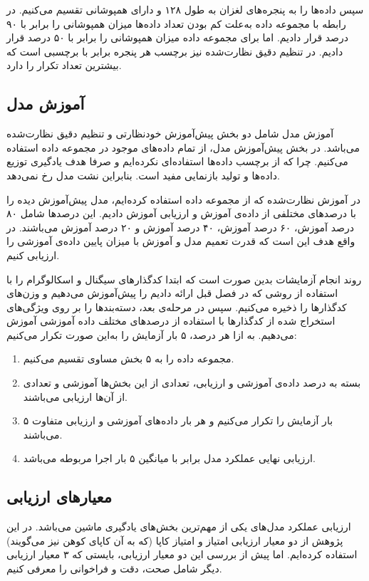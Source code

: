 سپس داده‌ها را به پنجره‌های لغزان به طول ۱۲۸ و دارای همپوشانی تقسیم می‌کنیم. در رابطه با مجموعه داده  به‌علت کم بودن تعداد داده‌ها میزان همپوشانی را برابر با ۹۰ درصد قرار دادیم. اما برای مجموعه داده  میزان همپوشانی را برابر با ۵۰ درصد قرار دادیم. در تنظیم دقیق نظارت‌شده نیز برچسب هر پنجره برابر با برچسبی است که بیشترین تعداد تکرار را دارد.

\subsection{آموزش مدل}

آموزش مدل شامل دو بخش پیش‌آموزش خودنظارتی و تنظیم دقیق نظارت‌شده می‌باشد. در بخش پیش‌آموزش مدل، از تمام داده‌های موجود در مجموعه داده استفاده می‌کنیم. چرا که از برچسب داده‌ها استفاده‌ای نکرده‌ایم و صرفا هدف یادگیری توزیع داده‌ها و تولید بازنمایی مفید است. بنابراین
نشت مدل
رخ نمی‌دهد.

در آموزش نظارت‌شده که از مجموعه داده  استفاده کرده‌ایم، مدل پیش‌آموزش دیده را با درصدهای مختلفی از داده‌ی آموزش و ارزیابی آموزش دادیم. این درصدها شامل ۸۰ درصد آموزش، ۶۰ درصد آموزش، ۴۰ درصد آموزش و ۲۰ درصد آموزش می‌باشند. در واقع هدف این است که قدرت تعمیم مدل و آموزش با میزان پایین داده‌ی آموزشی را ارزیابی کنیم.

روند انجام آزمایشات بدین صورت است که ابتدا کدگذارهای سیگنال و اسکالوگرام را با استفاده از روشی که در فصل قبل ارائه دادیم را پیش‌آموزش می‌دهیم و وزن‌های 
کدگذارها را ذخیره می‌کنیم. سپس در مرحله‌ی بعد، دسته‌بندها را بر روی ویژگی‌های استخراج شده از کدگذارها با استفاده از درصدهای مختلف داده آموزشی آموزش می‌دهیم. به ازا هر درصد، ۵ بار آزمایش را به‌این صورت تکرار می‌کنیم:
\begin{enumerate}
    \item مجموعه داده را به ۵ بخش مساوی تقسیم می‌کنیم.
    \item بسته به درصد داده‌ی آموزشی و ارزیابی، تعدادی از این بخش‌ها آموزشی و تعدادی از آن‌ها ارزیابی می‌باشند.
    \item ۵ بار آزمایش را تکرار می‌کنیم و هر بار داده‌های آموزشی و ارزیابی متفاوت می‌باشند.
    \item ارزیابی نهایی عملکرد مدل برابر با میانگین ۵ بار اجرا مربوطه می‌باشد.
\end{enumerate}

\subsection{معیارهای ارزیابی}

ارزیابی عملکرد مدل‌های یکی از مهم‌ترین بخش‌های یادگیری ماشین می‌باشد. در این پژوهش از دو معیار ارزیابی امتیاز 
و امتیاز کاپا
(که به آن کاپای کوهن نیز می‌گویند) استفاده کرده‌ایم. اما پیش از بررسی این دو معیار ارزیابی، بایستی که ۳ معیار ارزیابی دیگر شامل صحت، دقت و فراخوانی را معرفی کنیم.

